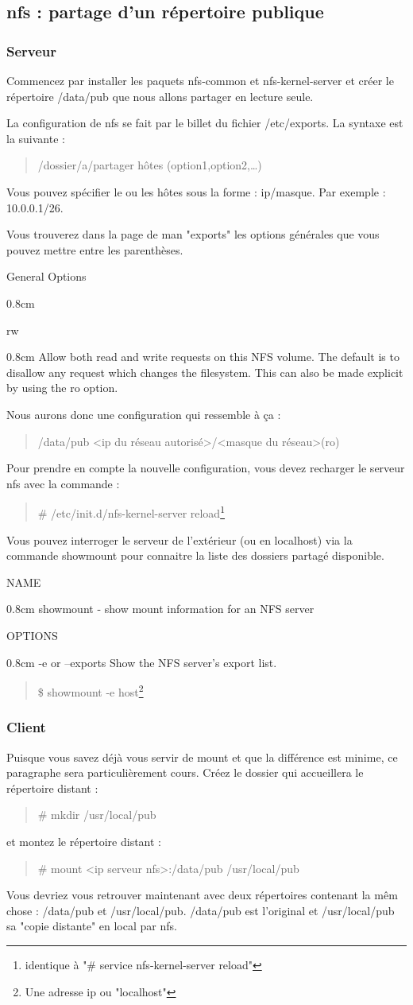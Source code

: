 \documentclass[a4paper]{article}
\newcommand{\commande}[1] {
    \begin{quote}
    \tt\raggedright #1 
    \end{quote}
}
\newcommand{\man}[2]{
    \begin{tcolorbox}[toprule=3mm,width=\textwidth,outer arc=0mm,colbacktitle=grayman,coltitle=black,colback={grayman},colframe={grayman},title={man : \tt #1}]
        \tt\raggedright #2
    \end{tcolorbox}
}
\newcommand{\mandesc}[1]{
    \begin{adjustwidth}{0.8cm}{}
        #1
    \end{adjustwidth}
}
\begin{document}
\subsection{nfs : partage d'un répertoire publique}
\subsubsection{Serveur}
\par Commencez par installer les paquets nfs-common et nfs-kernel-server et créer le répertoire /data/pub que nous allons partager en lecture seule.
\par La configuration de nfs se fait par le billet du fichier /etc/exports. La syntaxe est la suivante :
\commande{/dossier/a/partager hôtes (option1,option2,\dots)}
\par Vous pouvez spécifier le ou les hôtes sous la forme : ip/masque. Par exemple : 10.0.0.1/26.
\par Vous trouverez dans la page de man "exports" les options générales que vous pouvez mettre entre les parenthèses.
\man{exports}{
General Options
\mandesc{
rw
\mandesc{Allow both read and write requests on this NFS volume. The default is to disallow any request which changes the filesystem.  This can also be made explicit by using the ro option.}
}}
\par Nous aurons donc une configuration qui ressemble à ça :
\commande{/data/pub <ip du réseau autorisé>/<masque du réseau>(ro)}
\par Pour prendre en compte la nouvelle configuration, vous devez recharger le serveur nfs avec la commande :
\commande{\# /etc/init.d/nfs-kernel-server reload\footnote{identique à "\# service nfs-kernel-server reload"}}
\par Vous pouvez interroger le serveur de l'extérieur (ou en localhost) via la commande showmount pour connaitre la liste des dossiers partagé disponible.
\man{showmount}{NAME
\mandesc{showmount - show mount information for an NFS server}
OPTIONS
\mandesc{-e or --exports Show the NFS server's export list.}}
\commande{\$ showmount -e host\footnote{Une adresse ip ou "localhost"}}

\subsubsection{Client}
\par Puisque vous savez déjà vous servir de mount et que la différence est minime, ce paragraphe sera particulièrement cours. Créez le dossier qui accueillera le répertoire distant :
\commande{\# mkdir /usr/local/pub}
et montez le répertoire distant :
\commande{\# mount <ip serveur nfs>:/data/pub /usr/local/pub}
\par Vous devriez vous retrouver maintenant avec deux répertoires contenant la mêm chose : /data/pub et /usr/local/pub. /data/pub est l'original et /usr/local/pub sa "copie distante" en local par nfs.
\end{document}
